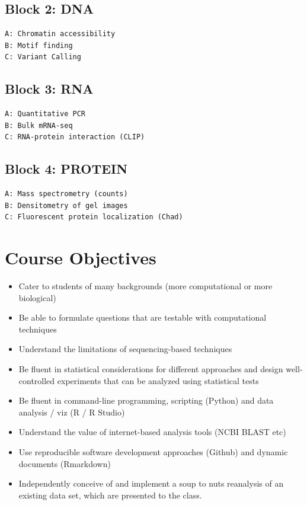 \documentclass[]{book}
\providecommand{\tightlist}{%
  \setlength{\itemsep}{0pt}\setlength{\parskip}{0pt}}
\begin{document}
\hypertarget{block-2-dna}{%
\subsection{Block 2: DNA}\label{block-2-dna}}

\begin{verbatim}
A: Chromatin accessibility
B: Motif finding
C: Variant Calling
\end{verbatim}

\hypertarget{block-3-rna}{%
\subsection{Block 3: RNA}\label{block-3-rna}}

\begin{verbatim}
A: Quantitative PCR
B: Bulk mRNA-seq
C: RNA-protein interaction (CLIP)
\end{verbatim}

\hypertarget{block-4-protein}{%
\subsection{Block 4: PROTEIN}\label{block-4-protein}}

\begin{verbatim}
A: Mass spectrometry (counts)
B: Densitometry of gel images 
C: Fluorescent protein localization (Chad)
\end{verbatim}

\hypertarget{course-objectives}{%
\section{Course Objectives}\label{course-objectives}}

\begin{itemize}
\tightlist
\item
  Cater to students of many backgrounds (more computational or more biological)
\item
  Be able to formulate questions that are testable with computational techniques
\item
  Understand the limitations of sequencing-based techniques
\item
  Be fluent in statistical considerations for different approaches and design well-controlled experiments that can be analyzed using statistical tests
\item
  Be fluent in command-line programming, scripting (Python) and data analysis / viz (R / R Studio)
\item
  Understand the value of internet-based analysis tools (NCBI BLAST etc)
\item
  Use reproducible software development approaches (Github) and dynamic documents (Rmarkdown)
\item
  Independently conceive of and implement a soup to nuts reanalysis of an existing data set, which are presented to the class.
\end{itemize}
\end{document}
